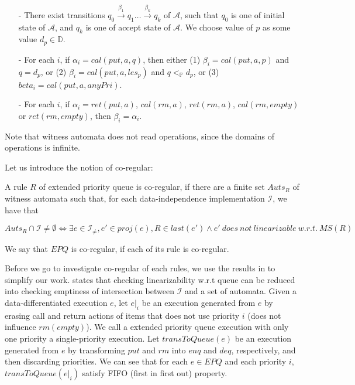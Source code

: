 \begin{itemize}
\setlength{\itemsep}{0.5pt}
\item[-] There exist transitions $q_0 \xrightarrow{\beta_1} q_1 \ldots \xrightarrow{\beta_k} q_k$ of $\mathcal{A}$, such that $q_0$ is one of initial state of $\mathcal{A}$, and $q_k$ is one of accept state of $\mathcal{A}$. We choose value of $p$ as some value $d_p \in \mathbb{D}$.

\item[-] For each $i$, if $\alpha_i = \textit{cal}(\textit{put},a,q)$, then either (1) $\beta_i = \textit{cal}(\textit{put},a,p)$ and $q = d_p$, or (2) $\beta_i = \textit{cal}(\textit{put},a,\textit{les}_p)$ and $q <_{\mathbb{P}} d_p$, or (3) $beta_i = \textit{cal}(\textit{put},a,\textit{anyPri})$.

\item[-] For each $i$, if $\alpha_i = \textit{ret}(\textit{put},a)$, $\textit{cal}(\textit{rm},a)$, $\textit{ret}(\textit{rm},a)$, $\textit{cal}(\textit{rm},\textit{empty})$ or $\textit{ret}(\textit{rm},\textit{empty})$, then $\beta_i = \alpha_i$.
\end{itemize}

Note that witness automata does not read operations, since the domains of operations is infinite.

Let us introduce the notion of co-regular:

\begin{definition}\label{def:co-regular of rules of extended priority queues}
A rule $R$ of extended priority queue is co-regular, if there are a finite set $\textit{Auts}_{R}$ of witness automata such that, for each data-independence implementation $\mathcal{I}$, we have that

$$\textit{Auts}_{R} \cap \mathcal{I} \neq \emptyset \Leftrightarrow \exists e \in \mathcal{I}_{\neq},e' \in \textit{proj}(e), R \in last(e') \wedge e' \ does \ not \ linearizable \ w.r.t. \ \textit{MS}(R)$$

We say that $\textit{EPQ}$ is co-regular, if each of its rule is co-regular.
\end{definition}

Before we go to investigate co-regular of each rules, we use the results in \cite{Bouajjani:2015} to simplify our work. \cite{Bouajjani:2015} states that checking linearizability w.r.t queue can be reduced into checking emptiness of intersection between $\mathcal{I}$ and a set of automata. Given a data-differentiated execution $e$, let $e \vert_{i}$ be an execution generated from $e$ by erasing call and return actions of items that does not use priority $i$ (does not influence $\textit{rm}(\textit{empty})$). We call a extended priority queue execution with only one priority a single-priority execution. Let $\textit{transToQueue}(e)$ be an execution generated from $e$ by transforming $\textit{put}$ and $\textit{rm}$ into $\textit{enq}$ and $\textit{deq}$, respectively, and then discarding priorities. We can see that for each $e \in \textit{EPQ}$ and each priority $i$, $\textit{transToQueue}(e \vert_{i})$ satisfy FIFO (first in first out) property.


